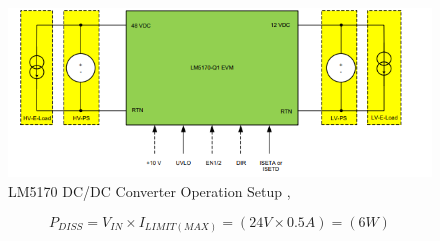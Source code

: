 \begin{figure}[h]
	\centering
	\includegraphics[width=1\textwidth]{Chap04/Figures/DC_DC_Converter_bench_setup.PNG}
	\caption{LM5170 DC/DC Converter Operation Setup \cite{TI_LM5170_BatteryTesting_Solution},\cite{TI_LM5170_EVM_User_Guide} }
	\label{fig:LM5170_DC_DC_Converter_Operation_Setup}
\end{figure}

\begin{equation}\label{eq:LTC_Pdissp_average}
    P_{DISS} = V_{IN} \times I_{LIMIT(MAX)}  = \left(24V \times 0.5A\right) = \left(6W\right)
\end{equation}

